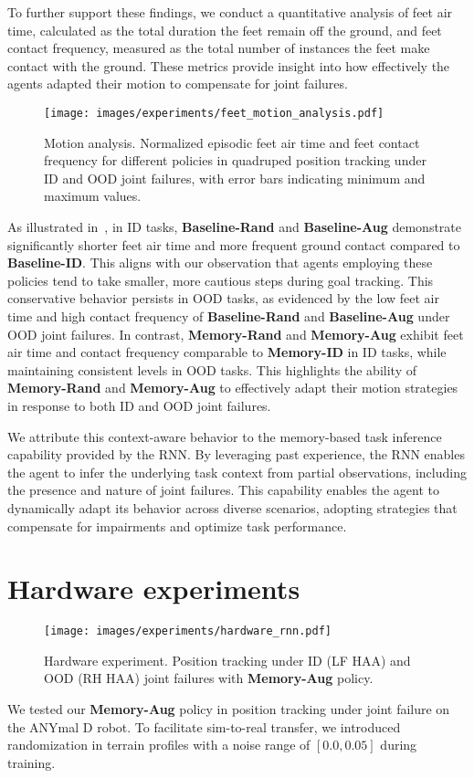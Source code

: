 To further support these findings, we conduct a quantitative analysis of feet air time, calculated as the total duration the feet remain off the ground, and feet contact frequency, measured as the total number of instances the feet make contact with the ground.
These metrics provide insight into how effectively the agents adapted their motion to compensate for joint failures.

\begin{figure}
    \centering
    \texttt{[image: images/experiments/feet\_motion\_analysis.pdf]}
    \caption{Motion analysis. Normalized episodic feet air time and feet contact frequency for different policies in quadruped position tracking under ID and OOD joint failures, with error bars indicating minimum and maximum values.}
    \label{fig:quantitative_motion_analysis}
\end{figure}

As illustrated in~, in ID tasks, \textbf{Baseline-Rand} and \textbf{Baseline-Aug} demonstrate significantly shorter feet air time and more frequent ground contact compared to \textbf{Baseline-ID}.
This aligns with our observation that agents employing these policies tend to take smaller, more cautious steps during goal tracking.
This conservative behavior persists in OOD tasks, as evidenced by the low feet air time and high contact frequency of \textbf{Baseline-Rand} and \textbf{Baseline-Aug} under OOD joint failures. 
In contrast, \textbf{Memory-Rand} and \textbf{Memory-Aug} exhibit feet air time and contact frequency comparable to \textbf{Memory-ID} in ID tasks, while maintaining consistent levels in OOD tasks.
This highlights the ability of \textbf{Memory-Rand} and \textbf{Memory-Aug} to effectively adapt their motion strategies in response to both ID and OOD joint failures.

We attribute this context-aware behavior to the memory-based task inference capability provided by the RNN. 
By leveraging past experience, the RNN enables the agent to infer the underlying task context from partial observations, including the presence and nature of joint failures. 
This capability enables the agent to dynamically adapt its behavior across diverse scenarios, adopting strategies that compensate for impairments and optimize task performance.

\section{Hardware experiments}
\begin{figure*}
\centering
\texttt{[image: images/experiments/hardware\_rnn.pdf]}
\caption{Hardware experiment. Position tracking under ID (LF HAA) and OOD (RH HAA) joint failures with \textbf{Memory-Aug} policy.}
\label{fig:hardware_rnn}
\end{figure*}
We tested our \textbf{Memory-Aug} policy in position tracking under joint failure on the ANYmal D robot. 
To facilitate sim-to-real transfer, we introduced randomization in terrain profiles with a noise range of \([0.0, 0.05]\) during training.

